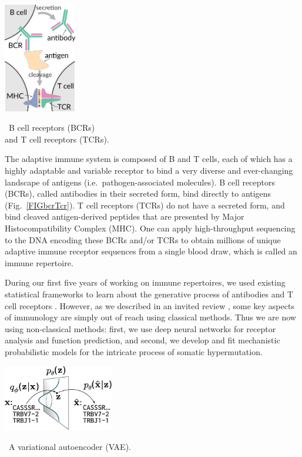 \documentclass[nobib]{tufte-handout}
\begin{document}
\begin{marginfigure}[0.in]%
\begin{centering}
  \includegraphics[width=1.25in]{bcr-tcr}
\end{centering}
  \caption{\
    B cell receptors (BCRs) \\ and T cell receptors (TCRs).
    }
  \label{FIGbcrTcr}
\end{marginfigure}%

The adaptive immune system is composed of B and T cells, each of which has a highly adaptable and variable receptor to bind a very diverse and ever-changing landscape of antigens (i.e.\ pathogen-associated molecules).
B cell receptors (BCRs), called antibodies in their secreted form, bind directly to antigens (Fig.~\ref{FIGbcrTcr}).
T cell receptors (TCRs) do not have a secreted form, and bind cleaved antigen-derived peptides that are presented by Major Histocompatibility Complex (MHC).
One can apply high-throughput sequencing to the DNA encoding these BCRs and/or TCRs to obtain millions of unique adaptive immune receptor sequences from a single blood draw, which is called an immune repertoire.

During our first five years of working on immune repertoires, we used existing statistical frameworks to learn about the generative process of antibodies and T cell receptors \cite{McCoy2015-qi, Cobey2015-dn, Ralph2016-kr, Ralph2016-yl, Ralph2017-ih, DeWitt2018-el, Dhar2018-ne, Zhang2018-gn, Davidsen2018-gn, DeWitt2018-ar, Simonich2019-nn, Feng2019-sj, Dhar2019-qg}.
However, as we described in an invited review \cite{Olson2018-lw}, some key aspects of immunology are simply out of reach using classical methods.
Thus we are now using non-classical methods:
first, we use deep neural networks for receptor analysis and function prediction, and second, we develop and fit mechanistic probabilistic models for the intricate process of somatic hypermutation.

\begin{marginfigure}[-0.4in]%
\begin{centering}
    \includegraphics[width=1.9in]{figures/vae.pdf}
\end{centering}
  \caption{\
    A variational autoencoder (VAE).
    }
  \label{FIGvae}
\end{marginfigure}%
\end{document}
